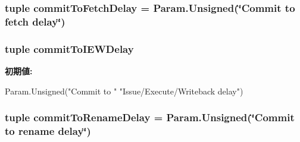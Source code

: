 \label{classSimpleOzoneCPU_1_1SimpleOzoneCPU_acaab18e678264ee264642b5be0d91157}
\hypertarget{classSimpleOzoneCPU_1_1SimpleOzoneCPU_aad1963f659c6e9595b5d1ff499e843d8}{
\subsubsection[{commitToFetchDelay}]{\setlength{\rightskip}{0pt plus 5cm}tuple {\bf commitToFetchDelay} = Param.Unsigned(\char`\"{}Commit to fetch delay\char`\"{})}}
\label{classSimpleOzoneCPU_1_1SimpleOzoneCPU_aad1963f659c6e9595b5d1ff499e843d8}
\hypertarget{classSimpleOzoneCPU_1_1SimpleOzoneCPU_afc77f4f67ebd047a4af56403975f4464}{
\subsubsection[{commitToIEWDelay}]{\setlength{\rightskip}{0pt plus 5cm}tuple {\bf commitToIEWDelay}}}
\label{classSimpleOzoneCPU_1_1SimpleOzoneCPU_afc77f4f67ebd047a4af56403975f4464}
{\bfseries 初期値:}
\begin{DoxyCode}
Param.Unsigned("Commit to "
               "Issue/Execute/Writeback delay")
\end{DoxyCode}
\hypertarget{classSimpleOzoneCPU_1_1SimpleOzoneCPU_a35c9cdaf793827c316dee784cbf39d96}{
\subsubsection[{commitToRenameDelay}]{\setlength{\rightskip}{0pt plus 5cm}tuple {\bf commitToRenameDelay} = Param.Unsigned(\char`\"{}Commit to rename delay\char`\"{})}}
\label{classSimpleOzoneCPU_1_1SimpleOzoneCPU_a35c9cdaf793827c316dee784cbf39d96}
